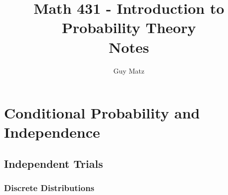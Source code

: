 \documentclass{report}
\title{
  \Huge{Math 431 - Introduction to Probability Theory}
  \\
  Notes
}
\author{\huge{Guy Matz}}
\date{}
\begin{document}

\setcounter{chapter}{1}
\chapter{Conditional Probability and Independence}

\setcounter{section}{3}
\section{Independent Trials}

\subsection{Discrete Distributions}
\end{document}
